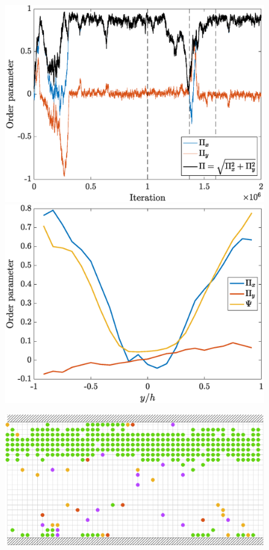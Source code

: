 \documentclass[aps,prl,twocolumn,amsmath,amssymb,superscriptaddress]{revtex4-1}
\begin{document}
\begin{figure}[h!]
   \begin{minipage}{.24\textwidth}
   \includegraphics[width=\textwidth]{ord_param_phi_g2_v1_15}
   \includegraphics[width=\textwidth]{ord_param_phi_g2_v1_15_fny}
   \end{minipage}
   \hspace{-5pt}
   \begin{minipage}{.24\textwidth}
   \includegraphics[width=\linewidth]{snap_g2_v1_15_t1e6}\\[4pt]

\end{minipage}
\end{figure}
\end{document}
